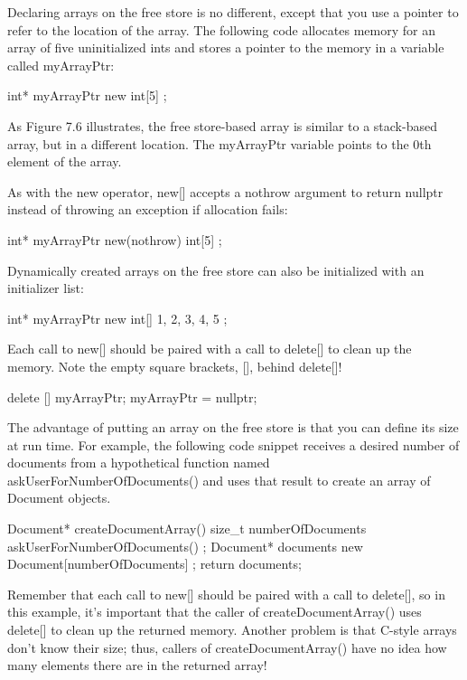 Declaring arrays on the free store is no different, except that you use a pointer to refer to the location of the array. The following code allocates memory for an array of five uninitialized ints and stores a pointer to the memory in a variable called myArrayPtr:

\begin{cpp}
int* myArrayPtr { new int[5] };
\end{cpp}

As Figure 7.6 illustrates, the free store-based array is similar to a stack-based array, but in a different location. The myArrayPtr variable points to the 0th element of the array.

As with the new operator, new[] accepts a nothrow argument to return nullptr instead of throwing an exception if allocation fails:

\begin{cpp}
int* myArrayPtr { new(nothrow) int[5] };
\end{cpp}


Dynamically created arrays on the free store can also be initialized with an initializer list:

\begin{cpp}
int* myArrayPtr { new int[] { 1, 2, 3, 4, 5 } };
\end{cpp}

Each call to new[] should be paired with a call to delete[] to clean up the memory. Note the empty square brackets, [], behind delete[]!

\begin{cpp}
delete [] myArrayPtr;
myArrayPtr = nullptr;
\end{cpp}

The advantage of putting an array on the free store is that you can define its size at run time. For example, the following code snippet receives a desired number of documents from a hypothetical function named askUserForNumberOfDocuments() and uses that result to create an array of Document objects.

\begin{cpp}
Document* createDocumentArray()
{
    size_t numberOfDocuments { askUserForNumberOfDocuments() };
    Document* documents { new Document[numberOfDocuments] };
    return documents;
}
\end{cpp}

Remember that each call to new[] should be paired with a call to delete[], so in this example, it’s important that the caller of createDocumentArray() uses delete[] to clean up the returned memory. Another problem is that C-style arrays don’t know their size; thus, callers of createDocumentArray() have no idea how many elements there are in the returned array!

